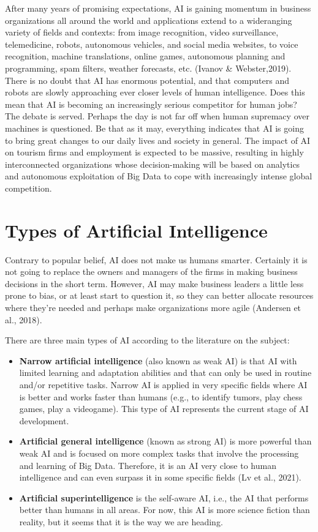 \documentclass[
  letterpaper,
  DIV=11,
  numbers=noendperiod]{scrreprt}
\begin{document}
After many years of promising expectations, AI is gaining momentum in
business organizations all around the world and applications extend to a
wideranging variety of fields and contexts: from image recognition,
video surveillance, telemedicine, robots, autonomous vehicles, and
social media websites, to voice recognition, machine translations,
online games, autonomous planning and programming, spam filters, weather
forecasts, etc. (Ivanov \& Webster,2019). There is no doubt that AI has
enormous potential, and that computers and robots are slowly approaching
ever closer levels of human intelligence. Does this mean that AI is
becoming an increasingly serious competitor for human jobs? The debate
is served. Perhaps the day is not far off when human supremacy over
machines is questioned. Be that as it may, everything indicates that AI
is going to bring great changes to our daily lives and society in
general. The impact of AI on tourism firms and employment is expected to
be massive, resulting in highly interconnected organizations whose
decision-making will be based on analytics and autonomous exploitation
of Big Data to cope with increasingly intense global competition.

\hypertarget{types-of-artificial-intelligence}{%
\section{Types of Artificial
Intelligence}\label{types-of-artificial-intelligence}}

Contrary to popular belief, AI does not make us humans smarter.
Certainly it is not going to replace the owners and managers of the
firms in making business decisions in the short term. However, AI may
make business leaders a little less prone to bias, or at least start to
question it, so they can better allocate resources where they're needed
and perhaps make organizations more agile (Andersen et al., 2018).

There are three main types of AI according to the literature on the
subject:

\begin{itemize}
\item
  \textbf{Narrow artificial intelligence} (also known as weak AI) is
  that AI with limited learning and adaptation abilities and that can
  only be used in routine and/or repetitive tasks. Narrow AI is applied
  in very specific fields where AI is better and works faster than
  humans (e.g., to identify tumors, play chess games, play a videogame).
  This type of AI represents the current stage of AI development.
\item
  \textbf{Artificial general intelligence} (known as strong AI) is more
  powerful than weak AI and is focused on more complex tasks that
  involve the processing and learning of Big Data. Therefore, it is an
  AI very close to human intelligence and can even surpass it in some
  specific fields (Lv et al., 2021).
\item
  \textbf{Artificial superintelligence} is the self-aware AI, i.e., the
  AI that performs better than humans in all areas. For now, this AI is
  more science fiction than reality, but it seems that it is the way we
  are heading.
\end{itemize}
\end{document}
